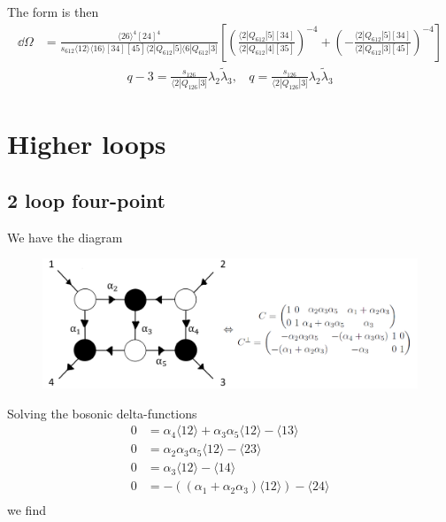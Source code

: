 \documentclass[letter,11pt]{article}
\newcommand{\ab}[1]{\langle #1 \rangle}
\newcommand{\sqb}[1]{[ #1 ]}
\newcommand{\aMs}[3]{\langle #1|#2|#3]}  		%
\begin{document}
The form is then
\begin{equation}
	\begin{aligned}
		\dd\Omega&=\frac{\ab{26}^4\sqb{24}^4}{s_{612}\ab{12}\ab{16}\sqb{34}\sqb{45}\aMs{2}{Q_{612}}{5}\aMs{6}{Q_{612}}{3}}\left[\left(\frac{\aMs{2}{Q_{612}}{5}\sqb{34}}{\aMs{2}{Q_{612}}{4}\sqb{35}}\right)^{-4}+\left(-\frac{\aMs{2}{Q_{612}}{5}\sqb{34}}{\aMs{2}{Q_{612}}{3}\sqb{45}}\right)^{-4}\right]
	\end{aligned}
\end{equation}
\begin{equation}
	\begin{aligned}
		q-3=\frac{s_{126}}{\aMs{2}{Q_{126}}{3}}\lambda_2\tilde \lambda_3,~~~~q=\frac{s_{126}}{\aMs{2}{Q_{126}}{3}}\lambda_2\tilde\lambda_3
	\end{aligned}
\end{equation}
\newpage
\section{Higher loops}
\subsection{2 loop four-point}
We have the diagram
\begin{figure}[H]
	\centering
	\includegraphics[width=0.7\linewidth]{two-loop}
	\caption{}
	\label{fig:two-loop}
\end{figure}
Solving the bosonic delta-functions
\begin{equation}
	\begin{aligned}
		0&=\alpha_{4} \langle 1 2 \rangle + \alpha_{3} \alpha_{5} \langle 1 2 \rangle - \langle 1 3 \rangle
		\\
		0&=\alpha_{2} \alpha_{3} \alpha_{5} \langle 1 2 \rangle - \langle 2 3 \rangle
		\\
		0&=\alpha_{3} \langle 1 2 \rangle - \langle 1 4 \rangle
		\\
		0&=-((\alpha_{1} + \alpha_{2} \alpha_{3}) \langle 1 2 \rangle) - \langle 2 4 \rangle
		\\
	\end{aligned}
\end{equation}
we find
\end{document}
